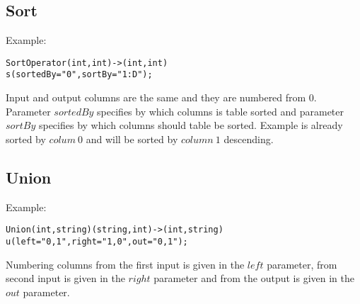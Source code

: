 \subsection{Sort}
Example:
\begin{lstlisting}
SortOperator(int,int)->(int,int)
s(sortedBy="0",sortBy="1:D");
\end{lstlisting}
Input and output columns are the same and they are numbered from 0. Parameter $sortedBy$ specifies by which columns is table sorted and parameter $sortBy$ specifies by which columns should table be sorted. Example is already sorted by $colum~0$ and will be sorted by $column~1$ descending.


\subsection{Union}
Example:
\begin{lstlisting}
Union(int,string)(string,int)->(int,string)
u(left="0,1",right="1,0",out="0,1");
\end{lstlisting}
Numbering columns from the first input is given in the $left$ parameter, from second input is given in the $right$ parameter and from the output is given in the $out$ parameter.

